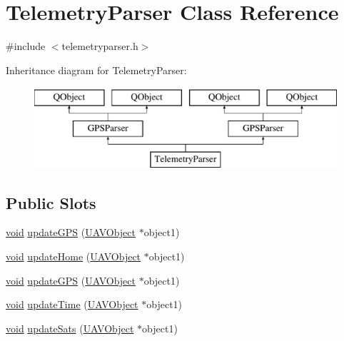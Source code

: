\hypertarget{class_telemetry_parser}{\section{Telemetry\-Parser Class Reference}
\label{class_telemetry_parser}
}


{\ttfamily \#include $<$telemetryparser.\-h$>$}

Inheritance diagram for Telemetry\-Parser\-:\begin{figure}[H]
\begin{center}
\leavevmode
\includegraphics[height=3.000000cm]{class_telemetry_parser}
\end{center}
\end{figure}
\subsection*{Public Slots}
\begin{DoxyCompactItemize}
\item 
\hyperlink{group___u_a_v_objects_plugin_ga444cf2ff3f0ecbe028adce838d373f5c}{void} \hyperlink{group___antenna_track_gadget_plugin_ga9b1c1509701c154ad1c3cdeef0cb522b}{update\-G\-P\-S} (\hyperlink{class_u_a_v_object}{U\-A\-V\-Object} $\ast$object1)
\item 
\hyperlink{group___u_a_v_objects_plugin_ga444cf2ff3f0ecbe028adce838d373f5c}{void} \hyperlink{group___antenna_track_gadget_plugin_ga0e7bcbaf20beede5d60913dc50505465}{update\-Home} (\hyperlink{class_u_a_v_object}{U\-A\-V\-Object} $\ast$object1)
\item 
\hyperlink{group___u_a_v_objects_plugin_ga444cf2ff3f0ecbe028adce838d373f5c}{void} \hyperlink{group___g_p_s_gadget_plugin_ga9b1c1509701c154ad1c3cdeef0cb522b}{update\-G\-P\-S} (\hyperlink{class_u_a_v_object}{U\-A\-V\-Object} $\ast$object1)
\item 
\hyperlink{group___u_a_v_objects_plugin_ga444cf2ff3f0ecbe028adce838d373f5c}{void} \hyperlink{group___g_p_s_gadget_plugin_gadc9bd95e3443207fbededb6a3fd014a7}{update\-Time} (\hyperlink{class_u_a_v_object}{U\-A\-V\-Object} $\ast$object1)
\item 
\hyperlink{group___u_a_v_objects_plugin_ga444cf2ff3f0ecbe028adce838d373f5c}{void} \hyperlink{group___g_p_s_gadget_plugin_ga3bdc5591ff2751d19016d60668b18440}{update\-Sats} (\hyperlink{class_u_a_v_object}{U\-A\-V\-Object} $\ast$object1)
\end{DoxyCompactItemize}

